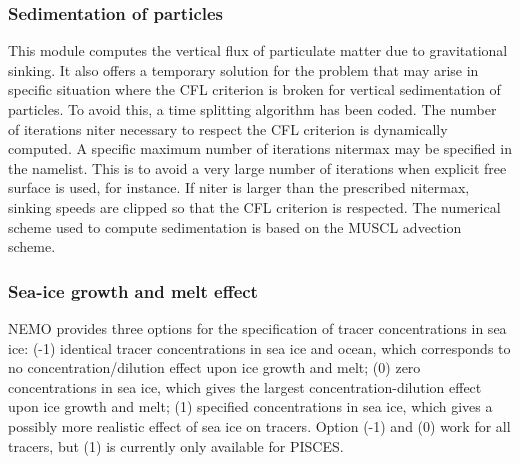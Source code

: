 \documentclass[../main/TOP_manual]{subfiles}
\begin{document}

\subsubsection{Sedimentation of particles}

This module computes the vertical flux of particulate matter due to gravitational sinking. It also offers a temporary solution for the problem that may arise in specific situation where the CFL criterion is broken for vertical sedimentation of particles. To avoid this, a time splitting algorithm has been coded. The number of iterations niter necessary to respect the CFL criterion is dynamically computed. A specific maximum number of iterations nitermax may be specified in the namelist. This is to avoid a very large number of iterations when explicit free surface is used, for instance. If niter is larger than the prescribed nitermax, sinking speeds are clipped so that the CFL criterion is respected. The numerical scheme used to compute sedimentation is based on the MUSCL advection scheme.


\subsubsection{Sea-ice growth and melt effect}

NEMO provides three options for the specification of tracer concentrations in sea ice: (-1) identical tracer concentrations in sea ice and ocean, which corresponds to no concentration/dilution effect upon ice growth and melt; (0) zero concentrations in sea ice, which gives the largest concentration-dilution effect upon ice growth and melt; (1) specified concentrations in sea ice, which gives a possibly more realistic effect of sea ice on tracers. Option (-1) and (0) work for all tracers, but (1) is currently only available for PISCES.

\end{document}
